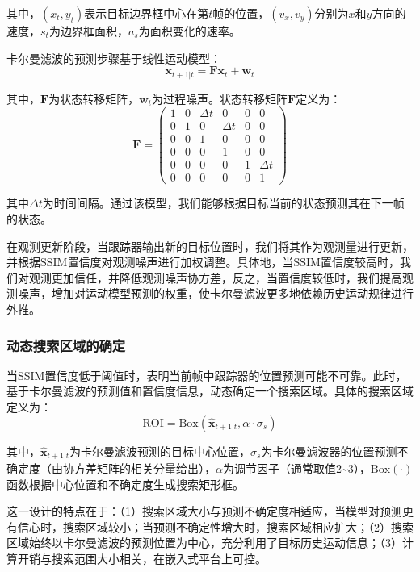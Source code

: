 其中，$(x_t, y_t)$表示目标边界框中心在第$t$帧的位置，$(v_x, v_y)$分别为$x$和$y$方向的速度，$s_t$为边界框面积，$a_s$为面积变化的速率。

卡尔曼滤波的预测步骤基于线性运动模型：
\begin{equation}
\mathbf{x}_{t+1|t} = \mathbf{F} \mathbf{x}_t + \mathbf{w}_t
\end{equation}

其中，$\mathbf{F}$为状态转移矩阵，$\mathbf{w}_t$为过程噪声。状态转移矩阵$\mathbf{F}$定义为：
\begin{equation}
\mathbf{F} = \begin{pmatrix}
1 & 0 & \Delta t & 0 & 0 & 0 \\
0 & 1 & 0 & \Delta t & 0 & 0 \\
0 & 0 & 1 & 0 & 0 & 0 \\
0 & 0 & 0 & 1 & 0 & 0 \\
0 & 0 & 0 & 0 & 1 & \Delta t \\
0 & 0 & 0 & 0 & 0 & 1
\end{pmatrix}
\end{equation}

其中$\Delta t$为时间间隔。通过该模型，我们能够根据目标当前的状态预测其在下一帧的状态。

在观测更新阶段，当跟踪器输出新的目标位置时，我们将其作为观测量进行更新，并根据SSIM置信度对观测噪声进行加权调整。具体地，当SSIM置信度较高时，我们对观测更加信任，并降低观测噪声协方差，反之，当置信度较低时，我们提高观测噪声，增加对运动模型预测的权重，使卡尔曼滤波更多地依赖历史运动规律进行外推。

\subsubsection{动态搜索区域的确定}

当SSIM置信度低于阈值时，表明当前帧中跟踪器的位置预测可能不可靠。此时，基于卡尔曼滤波的预测值和置信度信息，动态确定一个搜索区域。具体的搜索区域定义为：
\begin{equation}
\text{ROI} = \text{Box}(\hat{\mathbf{x}}_{t+1|t}, \alpha \cdot \sigma_s)
\end{equation}

其中，$\hat{\mathbf{x}}_{t+1|t}$为卡尔曼滤波预测的目标中心位置，$\sigma_s$为卡尔曼滤波器的位置预测不确定度（由协方差矩阵的相关分量给出），$\alpha$为调节因子（通常取值2\textasciitilde 3），$\text{Box}(\cdot)$函数根据中心位置和不确定度生成搜索矩形框。

这一设计的特点在于：（1）搜索区域大小与预测不确定度相适应，当模型对预测更有信心时，搜索区域较小；当预测不确定性增大时，搜索区域相应扩大；（2）搜索区域始终以卡尔曼滤波的预测位置为中心，充分利用了目标历史运动信息；（3）计算开销与搜索范围大小相关，在嵌入式平台上可控。

